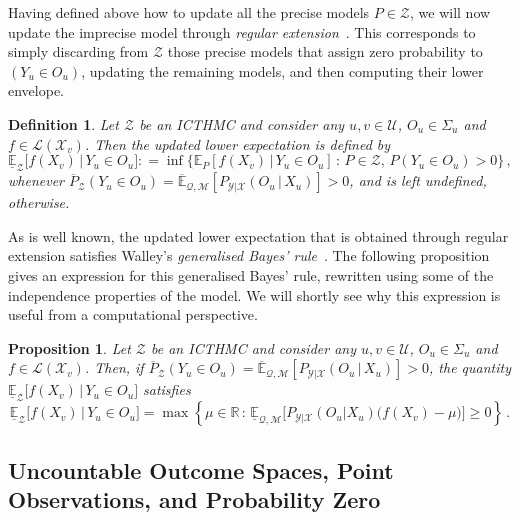 \documentclass[3p]{elsarticle}
\newtheorem{proposition}[theorem]{Proposition}
\newtheorem{definition}{Definition}
\newcommand{\reals}{\mathbb{R}}
\newcommand{\states}{\mathcal{X}}
\newcommand{\observs}{\mathcal{Y}}
\newcommand{\lexp}{\underline{\mathbb{E}}_{\rateset,\mathcal{M}}}
\newcommand{\uexp}{\overline{\mathbb{E}}_{\rateset,\mathcal{M}}}
\newcommand{\gambles}{\mathcal{L}}
\newcommand{\rateset}{\mathcal{Q}}
\newcommand{\coloneqq}{:\!=}
\begin{document}
Having defined above how to update all the precise models $P\in\mathcal{Z}$, we will now update the imprecise model through \emph{regular extension}~\citep{Walley:1991vk}. This corresponds to simply discarding from $\mathcal{Z}$ those precise models that assign zero probability to $(Y_u\in O_u)$, updating the remaining models, and then computing their lower envelope.

\begin{definition}\label{def:reg_ext_pos}
Let $\mathcal{Z}$ be an ICTHMC and consider any $u,v\in\mathcal{U}$, $O_u\in\Sigma_u$ and $f\in\gambles(\states_v)$. Then the updated lower expectation is defined by
\begin{equation*}
\underline{\mathbb{E}}_{\mathcal{Z}}\bigl[f(X_v)\,\vert\,Y_u\in O_u\bigr] \coloneqq \inf\bigl\{ \mathbb{E}_P[f(X_v)\,\vert\,Y_u\in O_u]\,:\, P\in\mathcal{Z},\, P(Y_u\in O_u)>0 \bigr\}\,,
\end{equation*}
whenever $\overline{P}_\mathcal{Z}(Y_u\in O_u)=\uexp[P_{\observs\vert\states}(O_u\,\vert\,X_u)]>0$, and is left undefined, otherwise.
\end{definition}

As is well known, the updated lower expectation that is obtained through regular extension satisfies Walley's \emph{generalised Bayes' rule}~\citep{Walley:1991vk}. The following proposition gives an expression for this generalised Bayes' rule, rewritten using some of the independence properties of the model. We will shortly see why this expression is useful from a computational perspective.
\begin{proposition}\label{prop:GBR_regular}
Let $\mathcal{Z}$ be an ICTHMC and consider any $u,v\in\mathcal{U}$, $O_u\in\Sigma_u$ and $f\in\gambles(\states_v)$. Then, if $\overline{P}_\mathcal{Z}(Y_u\in O_u) = \uexp[P_{\observs\vert\states}(O_u\,\vert\,X_u)] > 0$, the quantity $\underline{\mathbb{E}}_{\mathcal{Z}}\bigl[f(X_v)\,\vert\,Y_u\in O_u\bigr]$ satisfies
\begin{equation*}
\underline{\mathbb{E}}_{\mathcal{Z}}\bigl[f(X_v)\,\vert\,Y_u\in O_u\bigr] = \max\left\{\mu\in\reals\,:\, \lexp\bigl[P_{\observs\vert\states}(O_u\vert X_u)\bigl(f(X_v) - \mu\bigr)\bigr] \geq 0\right\}\,.
\end{equation*}
\end{proposition}

\subsection{Uncountable Outcome Spaces, Point Observations, and Probability Zero}\label{subsec:uncountable}
\end{document}
